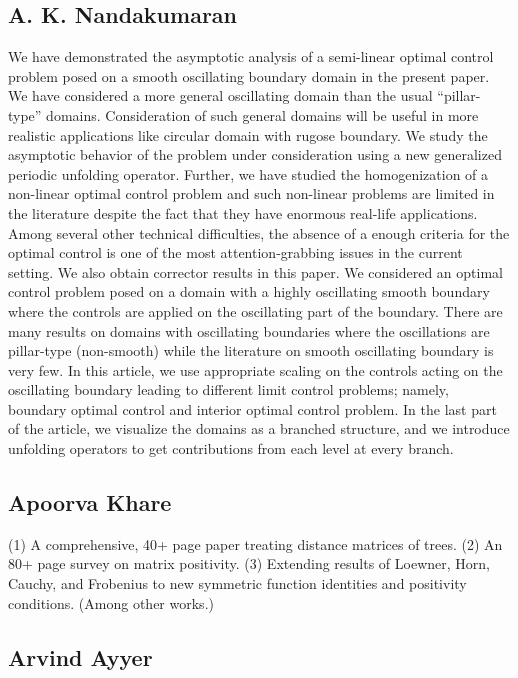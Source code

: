 \subsection{A. K. Nandakumaran}

We have demonstrated the asymptotic analysis of a semi-linear optimal control problem posed on a smooth oscillating boundary domain in the present paper. We have considered a more general oscillating domain than the usual “pillar-type” domains. Consideration of such general domains will be useful in more realistic applications like circular domain with rugose boundary. We study the asymptotic behavior of the problem under consideration using a new generalized periodic unfolding operator. Further, we have studied the homogenization of a non-linear optimal control problem and such non-linear problems are limited in the literature despite the fact that they have enormous real-life applications. Among several other technical difficulties, the absence of a enough criteria for the optimal control is one of the most attention-grabbing issues in the current setting. We also obtain corrector results in this paper.  We considered an optimal control problem posed on a domain with a highly oscillating smooth boundary where the controls are applied on the oscillating part of the boundary. There are many results on domains with oscillating boundaries where the oscillations are pillar-type (non-smooth) while the literature on smooth oscillating boundary is very few. In this article, we use appropriate scaling on the controls acting on the oscillating boundary leading to different limit control problems; namely, boundary optimal control and interior optimal control problem. In the last part of the article, we visualize the domains as a branched structure, and we introduce unfolding operators to get contributions from each level at every branch. 


\subsection{Apoorva Khare}

(1) A comprehensive, 40+ page paper treating distance matrices of trees. (2) An 80+ page survey on matrix positivity. (3) Extending results of Loewner, Horn, Cauchy, and Frobenius to new symmetric function identities and positivity conditions. (Among other works.)


\subsection{Arvind Ayyer}

